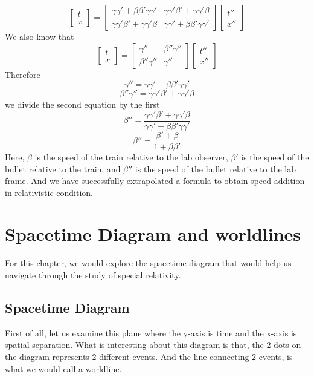 \documentclass[12pt]{book}
\begin{document}
\[
\begin{bmatrix}
    t\\ x
\end{bmatrix}
=
\begin{bmatrix}
    \gamma \gamma' + \beta \beta' \gamma \gamma' & \gamma\gamma' \beta' + \gamma \gamma' \beta\\
    \gamma\gamma' \beta' + \gamma \gamma' \beta & \gamma \gamma' + \beta \beta' \gamma \gamma'
\end{bmatrix}
\begin{bmatrix}
    t''\\ x''
\end{bmatrix}
\]
We also know that 
\[
\begin{bmatrix}
    t \\ x
\end{bmatrix}
=
\begin{bmatrix}
    \gamma''      &   \beta''\gamma''   \\
    \beta''\gamma'' &   \gamma''
\end{bmatrix}
\begin{bmatrix}
    t''\\ x''
\end{bmatrix}
\]
Therefore
\[
\gamma'' = \gamma \gamma' + \beta \beta' \gamma \gamma'
\]
\[
\beta''\gamma'' = \gamma\gamma' \beta' + \gamma \gamma' \beta
\]
we divide the second equation by the first
\[
\beta '' = \frac{\gamma\gamma' \beta' + \gamma \gamma' \beta}{\gamma \gamma' + \beta \beta' \gamma \gamma'}
\]
\[
\beta '' = \frac{\beta '+\beta}{1+\beta\beta'}
\]
Here, $\beta$ is the speed of the train relative to the lab observer, $\beta ' $ is the speed of the bullet relative to the train, and $\beta ''$ is the speed of the bullet relative to the lab frame. And we have successfully  extrapolated a formula to obtain speed addition in relativistic condition. 

\section{Spacetime Diagram and worldlines}
For this chapter, we would explore the spacetime diagram that would help us navigate through the study of special relativity.
\subsection{Spacetime Diagram}
First of all, let us examine this plane where the y-axis is time and the x-axis is spatial separation.
\newline
What is interesting about this diagram is that, the 2 dots on the diagram represents 2 different events. And the line connecting 2 events, is what we would call a worldline.
\end{document}
